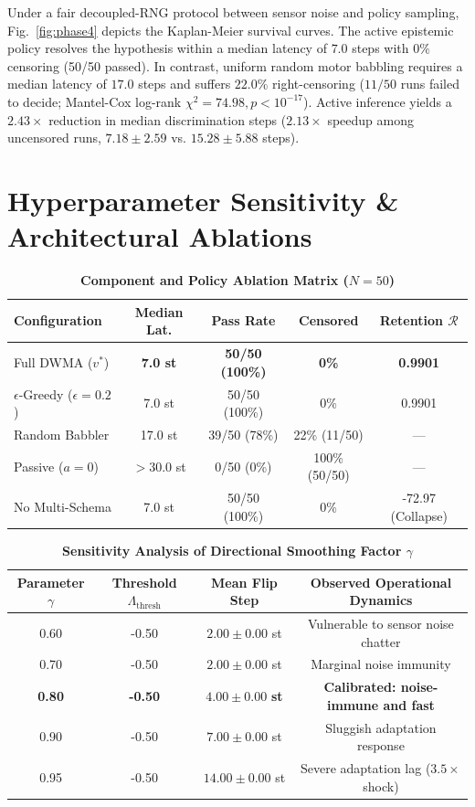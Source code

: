 \documentclass[preprint,12pt]{elsarticle}
\begin{document}
Under a fair decoupled-RNG protocol between sensor noise and policy sampling, Fig.~\ref{fig:phase4} depicts the Kaplan-Meier survival curves. The active epistemic policy resolves the hypothesis within a median latency of $7.0$ steps with $0\%$ censoring (50/50 passed). In contrast, uniform random motor babbling requires a median latency of $17.0$ steps and suffers $22.0\%$ right-censoring ($11/50$ runs failed to decide; Mantel-Cox log-rank $\chi^2 = 74.98, p < 10^{-17}$). Active inference yields a $2.43\times$ reduction in median discrimination steps ($2.13\times$ speedup among uncensored runs, $7.18 \pm 2.59$ vs. $15.28 \pm 5.88$ steps).

\section{Hyperparameter Sensitivity \& Architectural Ablations}
\label{sec:ablations}

\begin{table}[t]
\centering
\small
\caption{\textbf{Component and Policy Ablation Matrix ($N = 50$)}}
\label{tab:ablation}
\begin{tabular}{lcccc}
\toprule
\textbf{Configuration} & \textbf{Median Lat.} & \textbf{Pass Rate} & \textbf{Censored} & \textbf{Retention $\mathcal{R}$} \\
\midrule
Full DWMA ($v^*$) & \textbf{7.0 st} & \textbf{50/50 (100\%)} & \textbf{0\%} & \textbf{0.9901} \\
$\epsilon$-Greedy ($\epsilon=0.2$) & 7.0 st & 50/50 (100\%) & 0\% & 0.9901 \\
Random Babbler & 17.0 st & 39/50 (78\%) & 22\% (11/50) & --- \\
Passive ($a = 0$) & $>30.0$ st & 0/50 (0\%) & 100\% (50/50) & --- \\
No Multi-Schema & 7.0 st & 50/50 (100\%) & 0\% & -72.97 (Collapse) \\
\bottomrule
\end{tabular}
\end{table}

\begin{table}[t]
\centering
\small
\caption{\textbf{Sensitivity Analysis of Directional Smoothing Factor $\gamma$}}
\label{tab:sensitivity}
\begin{tabular}{cccc}
\toprule
\textbf{Parameter $\gamma$} & \textbf{Threshold $\Lambda_{\text{thresh}}$} & \textbf{Mean Flip Step} & \textbf{Observed Operational Dynamics} \\
\midrule
0.60 & -0.50 & $2.00 \pm 0.00$ st & Vulnerable to sensor noise chatter \\
0.70 & -0.50 & $2.00 \pm 0.00$ st & Marginal noise immunity \\
\textbf{0.80} & \textbf{-0.50} & $\mathbf{4.00 \pm 0.00}$ \textbf{st} & \textbf{Calibrated: noise-immune and fast} \\
0.90 & -0.50 & $7.00 \pm 0.00$ st & Sluggish adaptation response \\
0.95 & -0.50 & $14.00 \pm 0.00$ st & Severe adaptation lag ($3.5\times$ shock) \\
\bottomrule
\end{tabular}
\end{table}
\end{document}
